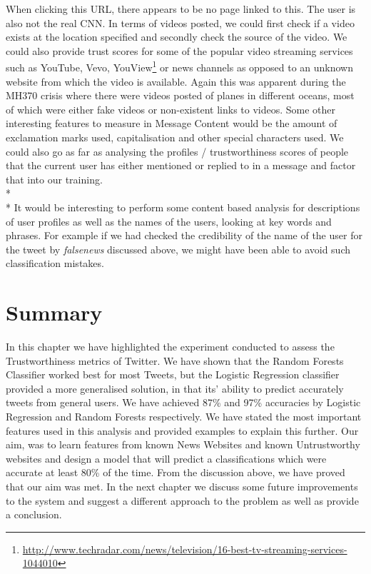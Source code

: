 \noindent
When clicking this URL, there appears to be no page linked to this. The user is also not the real CNN. In terms of videos posted, we could first check if a video exists at the location specified and secondly check the source of the video. We could also provide trust scores for some of the popular video streaming services such as YouTube, Vevo, YouView\footnote{\url{http://www.techradar.com/news/television/16-best-tv-streaming-services-1044010}} or news channels as opposed to an unknown website from which the video is available. Again this was apparent during the MH370 crisis where there were videos posted of planes in different oceans, most of which were either fake videos or non-existent links to videos.  Some other interesting features to measure in Message Content would be the amount of exclamation marks used, capitalisation and other special characters used. We could also go as far as analysing the profiles / trustworthiness scores of people that the current user has either mentioned or replied to in a message and factor that into our training. \\*\\*
\noindent
It would be interesting to perform some content based analysis for descriptions of user profiles as well as the names of the users, looking at key words and phrases. For example if we had checked the credibility of the name of the user for the tweet by \textit{falsenews} discussed above, we might have been able to avoid such classification mistakes. 
\section{Summary}
In this chapter we have highlighted the experiment conducted to assess the Trustworthiness metrics of Twitter. We have shown that the Random Forests Classifier worked best for most Tweets, but the Logistic Regression classifier provided a more generalised solution, in that its' ability to predict accurately tweets from general users. We have achieved 87\% and 97\% accuracies by Logistic Regression and Random Forests respectively. We have stated the most important features used in this analysis and provided examples to explain this further.  Our aim, was to learn features from known News Websites and known Untrustworthy websites and design a model that will predict a classifications which were accurate  at least 80\% of the time. From the discussion above, we have proved that our aim was met. In the next chapter we discuss some future improvements to the system and suggest a different approach to the problem as well as provide a conclusion.  